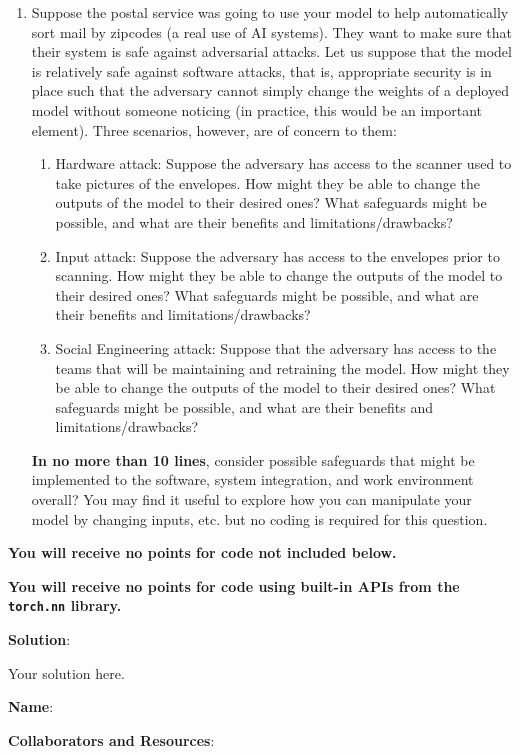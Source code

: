 \documentclass[submit]{../harvardml}
\newenvironment{solution}{
    \vspace{2mm}
    \color{blue}\noindent\textbf{Solution}:
}{}
\begin{document}
\begin{problem}
\begin{enumerate}
  \item Suppose the postal service was going to use your model to help automatically sort mail by zipcodes (a real use of AI systems).  They want to make sure that their system is safe against adversarial attacks.  Let us suppose that the model is relatively safe against software attacks, that is, appropriate security is in place such that the adversary cannot simply change the weights of a deployed model without someone noticing (in practice, this would be an important element).  Three scenarios, however, are of concern to them:
        \begin{enumerate}
          \item Hardware attack: Suppose the adversary has access to the
                scanner used to take pictures of the envelopes.  How might
                they be able to change the outputs of the model to their
                desired ones?  What safeguards might be possible, and what
                are their benefits and limitations/drawbacks?
          \item Input attack: Suppose the adversary has access to the
                envelopes prior to scanning.  How might they be able to
                change the outputs of the model to their desired ones?
                What safeguards might be possible, and what are their
                benefits and limitations/drawbacks?
          \item Social Engineering attack: Suppose that the adversary
                has access to the teams that will be maintaining and
                retraining the model.  How might they be able to change the
                outputs of the model to their desired ones?  What safeguards
                might be possible, and what are their benefits and
                limitations/drawbacks?
        \end{enumerate}
        \textbf{In no more than 10 lines}, consider possible safeguards that might be implemented to the software, system integration, and work environment overall?  You may find
        it useful to explore how you can manipulate your model by
        changing inputs, etc. but no coding is required for this
        question.

\end{enumerate}

{\bfseries You will receive no points for code not included below.}

{\bfseries You will receive no points for code using built-in APIs from the \verb|torch.nn| library.}

\end{problem}


\begin{solution}
	Your solution here.
\end{solution}

\newpage

\textbf{Name}:

\textbf{Collaborators and Resources}: 
\end{document}
